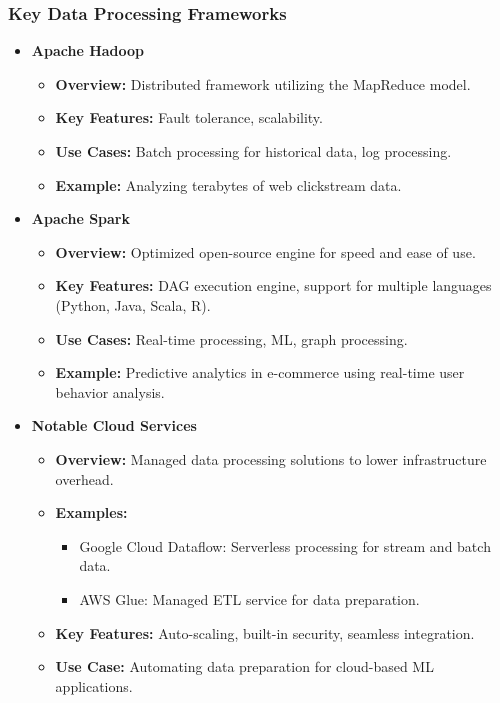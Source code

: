 \documentclass[aspectratio=169]{beamer}
\begin{document}
\begin{frame}[fragile]
    \frametitle{Key Data Processing Frameworks}
    \begin{itemize}
        \item \textbf{Apache Hadoop}
            \begin{itemize}
                \item \textbf{Overview:} Distributed framework utilizing the MapReduce model.
                \item \textbf{Key Features:} Fault tolerance, scalability.
                \item \textbf{Use Cases:} Batch processing for historical data, log processing.
                \item \textbf{Example:} Analyzing terabytes of web clickstream data.
            \end{itemize}

        \item \textbf{Apache Spark}
            \begin{itemize}
                \item \textbf{Overview:} Optimized open-source engine for speed and ease of use.
                \item \textbf{Key Features:} DAG execution engine, support for multiple languages (Python, Java, Scala, R).
                \item \textbf{Use Cases:} Real-time processing, ML, graph processing.
                \item \textbf{Example:} Predictive analytics in e-commerce using real-time user behavior analysis.
            \end{itemize}

        \item \textbf{Notable Cloud Services}
            \begin{itemize}
                \item \textbf{Overview:} Managed data processing solutions to lower infrastructure overhead.
                \item \textbf{Examples:} 
                    \begin{itemize}
                        \item Google Cloud Dataflow: Serverless processing for stream and batch data.
                        \item AWS Glue: Managed ETL service for data preparation.
                    \end{itemize}
                \item \textbf{Key Features:} Auto-scaling, built-in security, seamless integration.
                \item \textbf{Use Case:} Automating data preparation for cloud-based ML applications.
            \end{itemize}
    \end{itemize}
\end{frame}
\end{document}
